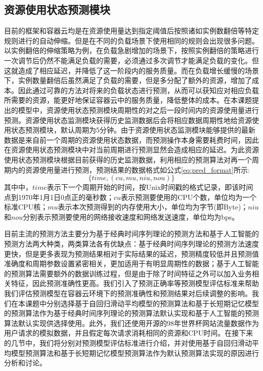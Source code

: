 \subsection{资源使用状态预测模块}\label{sec:prediction}
目前的框架和容器云均是在资源使用量达到指定阈值后按照诸如实例数翻倍等特定规则进行的自动伸缩。但是在不同的负载场景下使用相同的规则会出现很多问题。以实例翻倍的伸缩策略为例，在负载急剧增加的场景下，按照实例翻倍的策略进行一次调节后仍然不能满足负载的需要，必须通过多次调节才能满足负载的变化。但这就造成了相应延迟，并降低了这一阶段内的服务质量。而在负载增长缓慢的场景下，实例数量翻倍后虽然满足了负载的需要，但是多分配了额外的资源，增加了成本。因此通过可靠的方法对将来的负载状态进行预测，从而可以获知应对相应负载所需要的资源，能更好地保证容器云中的服务质量，降低整体的成本。在本课题提出的模型中，资源使用状态预测模块周期性的对之后一段时间内的资源使用量进行预测。资源使用状态监测模块获得历史监测数据后会将相应数据周期性地给资源使用状态预测模块，默认周期为5分钟。由于资源使用状态监测模块能够提供的最新数据是来自前一个周期的资源使用状态数据，而预测操作本身需要耗费时间，因此在资源使用状态预测模块中对当前周期进行预测显然会造成相应的延迟。为此资源使用状态预测模块根据目前获得的历史监测数据，利用相应的预测算法对再一个周期内的资源使用量进行预测，预测结果的数据格式如公式\ref{eq:pred_format}所示:
\begin{equation}\label{eq:pred_format}
\{time, (cu, mu, niu, nou)\}
\end{equation}
其中中，$time$表示下一个周期开始的时间，按Unix时间戳的格式记录，即该时间点到1970年1月1日0点正的毫秒数；$cu$表示预测要使用的CPU个数，单位均为一个标准CPU核；$mu$表示本次预测得到的内存使用大小，单位均为字节(即Byte)；$niu$和$nou$分别表示预测要使用的网络接收速度和网络发送速度，单位均为bps。

目前主流的预测方法主要分为基于经典时间序列理论的预测方法和基于人工智能的预测方法两大种类，两类算法各有优缺点：基于经典时间序列理论的预测方法速度更快，但是更多表现为预测结果相对于实际结果的延迟，预测精度较低并且预测值准确度和周期参数设置紧密相关，更加适用于有明显周期性的数据；基于人工智能的预测算法需要额外的数据训练过程，但是由于除了时间特征之外可以加入业务相关特征，因此预测准确性更高。我们引入了预测正确率等预测模型评估标准来帮助我们评估预测模型在容器云环境下的预测准确性和预测结果对后续调整的影响。我们在本课题中分别选择基于自回归滑动平均模型的预测算法和基于长短期记忆模型\cite{hochreiter1997long}的预测算法作为基于经典时间序列理论的预测算法默认实现和基于人工智能的预测算法默认实现供选择使用。此外，我们还使用开源的98年世界杯网站流量数据\cite{arlitt2000workload}作为用户请求的模拟数据，并且假定每次请求消耗相同的资源和CPU时间。在接下来的几节中，我们将分别对预测模型评估标准进行介绍，并对使用基于自回归滑动平均模型预测算法和基于长短期记忆模型预测算法作为默认预测算法实现的原因进行分析和讨论。

